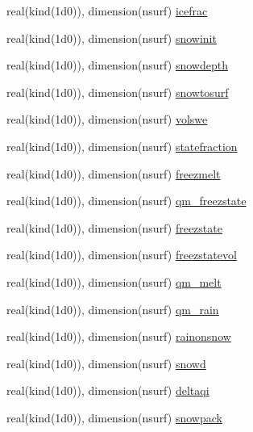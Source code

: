 \begin{DoxyCompactItemize}
\item 
real(kind(1d0)), dimension(nsurf) \hyperlink{namespaceallocatearray_af9cf09d85fc9f2037dbfffabb0a6dd8c}{icefrac}
\item 
real(kind(1d0)), dimension(nsurf) \hyperlink{namespaceallocatearray_af7e6a5b3ee785c8dda0fa0dc4c1ceb69}{snowinit}
\item 
real(kind(1d0)), dimension(nsurf) \hyperlink{namespaceallocatearray_a2aa940f81b7bfe5c4815dd2d15e5c734}{snowdepth}
\item 
real(kind(1d0)), dimension(nsurf) \hyperlink{namespaceallocatearray_aeddb481b8d76a9bd63fcc32506360636}{snowtosurf}
\item 
real(kind(1d0)), dimension(nsurf) \hyperlink{namespaceallocatearray_a69a92d219248dd5badf19a6cbcdfb372}{volswe}
\item 
real(kind(1d0)), dimension(nsurf) \hyperlink{namespaceallocatearray_a4ff0bd306cbe29d16f46ecdd19327b61}{statefraction}
\item 
real(kind(1d0)), dimension(nsurf) \hyperlink{namespaceallocatearray_a165ac402a66632f6391621809d9f4e06}{freezmelt}
\item 
real(kind(1d0)), dimension(nsurf) \hyperlink{namespaceallocatearray_a8a4eb23995f7afa0230b8afc6fefd81d}{qm\+\_\+freezstate}
\item 
real(kind(1d0)), dimension(nsurf) \hyperlink{namespaceallocatearray_af5b993a8153934d57f5a466152bdd625}{freezstate}
\item 
real(kind(1d0)), dimension(nsurf) \hyperlink{namespaceallocatearray_aaace92afa1f3dd88d1517345cbc9faba}{freezstatevol}
\item 
real(kind(1d0)), dimension(nsurf) \hyperlink{namespaceallocatearray_ad91b6e6a19469cd5c3a450fa56b031fa}{qm\+\_\+melt}
\item 
real(kind(1d0)), dimension(nsurf) \hyperlink{namespaceallocatearray_af875c3c6d435a8f1c4c5590f22d5ac61}{qm\+\_\+rain}
\item 
real(kind(1d0)), dimension(nsurf) \hyperlink{namespaceallocatearray_a7cebe6a894aabf8474a3a9d98dada68d}{rainonsnow}
\item 
real(kind(1d0)), dimension(nsurf) \hyperlink{namespaceallocatearray_af472b50234fe5d6af80ebf8a3b2a1863}{snowd}
\item 
real(kind(1d0)), dimension(nsurf) \hyperlink{namespaceallocatearray_aca62321fa80aef03d41d2ed66f3ade3a}{deltaqi}
\item 
real(kind(1d0)), dimension(nsurf) \hyperlink{namespaceallocatearray_a0c3675a79f0c6c3921beb95eb4d9d48f}{snowpack}
\item 

\end{DoxyCompactItemize}
